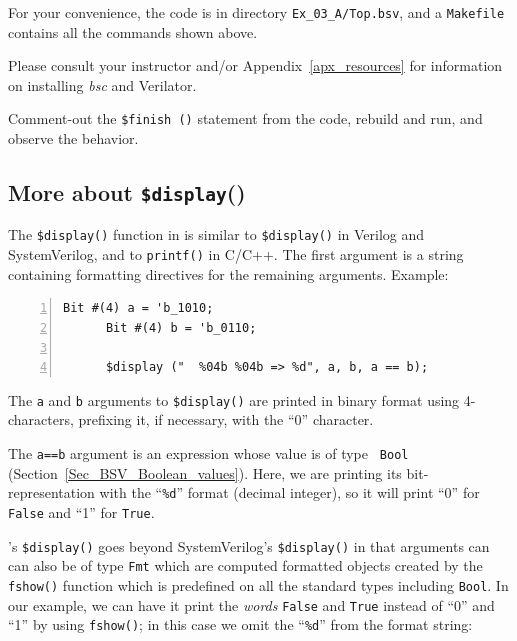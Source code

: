 For your convenience, the code is in directory \verb|Ex_03_A/Top.bsv|,
and a \verb|Makefile| contains all the commands shown above.

Please consult your instructor and/or Appendix~\ref{apx_resources} for
information on installing \emph{bsc} and Verilator.

\Exercise

Comment-out the \verb|$finish ()| statement from the code, rebuild and
run, and observe the behavior.

\Endexercise


\subsection{More about {\tt \$display}()}

\label{BSV_display}

The \verb|$display()| function in {\BSV} is similar to
\verb|$display()| in Verilog and SystemVerilog, and to \verb|printf()|
in C/C++. The first argument is a string containing formatting
directives for the remaining arguments. Example:

{\small
\begin{Verbatim}[frame=single, numbers=left]
      Bit #(4) a = 'b_1010;
      Bit #(4) b = 'b_0110;

      $display ("  %04b %04b => %d", a, b, a == b);
\end{Verbatim}
}

The {\tt a} and {\tt b} arguments to \verb|$display()| are printed in
binary format using 4-characters, prefixing it, if necessary, with the
``0'' character.

The {\tt a==b} argument is an expression whose value is of type {\tt
Bool} (Section~\ref{Sec_BSV_Boolean_values}).  Here, we are printing
its bit-representation with the ``\verb|%d|'' format (decimal
integer), so it will print ``0'' for \verb|False| and ``1'' for
\verb|True|.

{\BSV}'s \verb|$display()| goes beyond SystemVerilog's
\verb|$display()| in that arguments can can also be of type \verb|Fmt|
which are computed formatted objects created by the \verb|fshow()|
function which is predefined on all the standard types including
\verb|Bool|.  In our example, we can have it print the \emph{words}
\verb|False| and \verb|True| instead of ``0'' and ``1'' by using
\verb|fshow()|; in this case we omit the ``\verb|%d|'' from the format
string:


